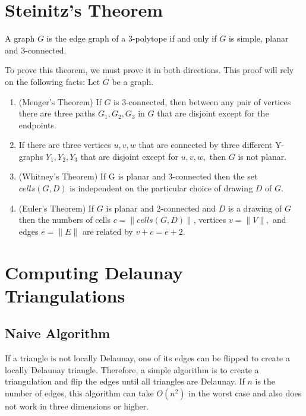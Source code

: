 \documentclass[english]{article}
\begin{document}
\section{Steinitz's Theorem}
 A graph $G$ is the edge graph of a 3-polytope if and only if $G$ is simple, planar and 3-connected.
 
 To prove this theorem, we must prove it in both directions. This proof will rely on the following facts:
 Let $G$ be a graph.
 \begin{enumerate}
 	\item (Menger's Theorem) If $G$ is 3-connected, then between any pair of vertices there are three paths $G_1, G_2, G_3$ in $G$ that are disjoint except for the endpoints.
	\item If there are three vertices $u,v,w$ that are connected by three different Y-graphs $Y_1, Y_2, Y_3$ that are disjoint except for $u,v,w,$ then $G$ is not planar.
	\item (Whitney's Theorem) If G is planar and 3-connected then the set $cells(G,D)$ is independent on the particular choice of drawing $D$ of $G$.
	\item (Euler's Theorem) If $G$ is planar and 2-connected and $D$ is a drawing of $G$ then the numbers of cells $c= \|cells(G,D)\|$, vertices $v = \|V\|,$ and edges $e = \|E\|$ are related by  $v+c = e+2$.
	
 \end{enumerate}

\section{Computing Delaunay Triangulations}
\subsection{Naive Algorithm}
If a triangle is not locally Delaunay, one of its edges can be flipped to create a locally Delaunay triangle. Therefore, a simple algorithm is to create a triangulation and flip the edges until all triangles are Delaunay. If $n$ is the number of edges, this algorithm can take $O(n^2)$ in the worst case and also does not work in three dimensions or higher.
\end{document}
